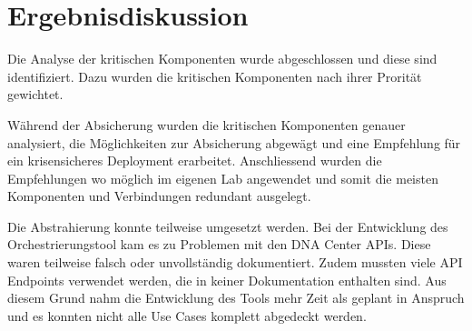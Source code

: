 \section{Ergebnisdiskussion}

Die Analyse der kritischen Komponenten wurde abgeschlossen und diese sind identifiziert. Dazu wurden die kritischen Komponenten nach ihrer Prorität gewichtet. 

Während der Absicherung wurden die kritischen Komponenten genauer analysiert, die Möglichkeiten zur Absicherung abgewägt und eine Empfehlung für ein krisensicheres Deployment erarbeitet. Anschliessend wurden die Empfehlungen wo möglich im eigenen Lab angewendet und somit die meisten Komponenten und Verbindungen redundant ausgelegt.

Die Abstrahierung konnte teilweise umgesetzt werden. Bei der Entwicklung des Orchestrierungstool kam es zu Problemen mit den DNA Center APIs. Diese waren teilweise falsch oder unvollständig dokumentiert. Zudem mussten viele API Endpoints verwendet werden, die in keiner Dokumentation enthalten sind.
Aus diesem Grund nahm die Entwicklung des Tools mehr Zeit als geplant in Anspruch und es konnten nicht alle Use Cases komplett abgedeckt werden.

